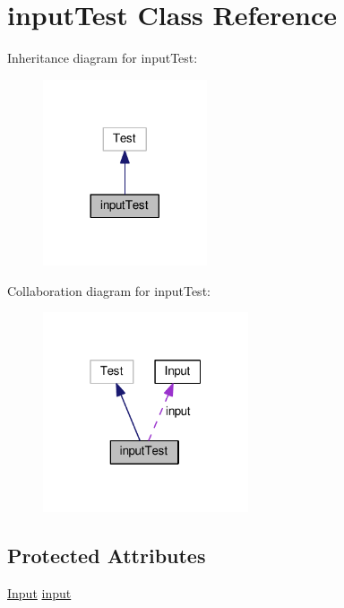 \hypertarget{classinputTest}{}\section{input\+Test Class Reference}
\label{classinputTest}


Inheritance diagram for input\+Test\+:
\nopagebreak
\begin{figure}[H]
\begin{center}
\leavevmode
\includegraphics[width=137pt]{classinputTest__inherit__graph}
\end{center}
\end{figure}


Collaboration diagram for input\+Test\+:
\nopagebreak
\begin{figure}[H]
\begin{center}
\leavevmode
\includegraphics[width=172pt]{classinputTest__coll__graph}
\end{center}
\end{figure}
\subsection*{Protected Attributes}
\begin{DoxyCompactItemize}
\item 
\hyperlink{classInput}{Input} \hyperlink{classinputTest_a882f2a4014812a95a6d58db894f288b1}{input}
\end{DoxyCompactItemize}



